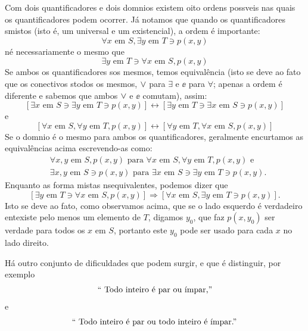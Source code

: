 Com dois quantificadores e dois dom\ih nios existem oito ordens poss\ih veis nas quais os quantificadores podem ocorrer. J\'a notamos que quando os quantificadores s\ao mistos (isto \'e, um universal e um existencial), a ordem \'e importante:
\[
\forall x \textrm{ em } S, \exists y \textrm{ em } T \ni  p(x,y)
\]
n\ao \'e necessariamente o mesmo que
\[
\exists y \textrm{ em } T \ni \forall x \textrm{ em } S, p(x,y)
\]
Se ambos os quantificadores s\ao os mesmos, temos equival\^encia (isto se deve ao fato que os conectivos s\ao todos os mesmos, $\vee$ para $\exists$ e $\ee$ para $\forall$; apenas a ordem \'e diferente e sabemos que ambos $\vee$ e $\ee$ comutam), assim:
\[
[\exists x \textrm{ em } S \ni \exists y \textrm{ em } T \ni p(x,y)]\leftrightarrow[\exists y \textrm{ em } T \ni \exists x \textrm{ em } S \ni p(x,y)]
\]
e
\[
[\forall x \textrm{ em } S, \forall y \textrm{ em } T, p(x,y)]\leftrightarrow[\forall y \textrm{ em } T, \forall x \textrm{ em } S, p(x,y)]
\]
Se o dom\ih nio \'e o mesmo para ambos os quantificadores, geralmente encurtamos as equival\^encias acima escrevendo-as como:
\begin{equation*}
 \begin{aligned}
  &\forall x,y \textrm{ em } S, p(x,y) \textrm{ para }  \forall x \textrm{ em } S, \forall y \textrm{ em } T, p(x,y) \textrm{ e }\\
  &\exists x,y \textrm{ em } S \ni p(x,y) \textrm{ para } \exists x \textrm{ em } S \ni \exists y \textrm{ em } T \ni p(x,y).
 \end{aligned}
\end{equation*}
Enquanto as forma mistas n\ao s\ao equivalentes, podemos dizer que
\[
[\exists y \textrm{ em } T \ni \forall x \textrm{ em } S, p(x,y)]\Rightarrow[\forall x \textrm{ em } S, \exists y \textrm{ em } T \ni  p(x,y)].
\]
Isto se deve ao fato, como observamos acima, que se o lado esquerdo \'e verdadeiro ent\ao existe pelo menos um elemento de $T$, digamos $y_0$, que faz $p(x,y_0)$ ser verdade para todos os $x$ em $S$, portanto este $y_0$ pode ser usado para cada $x$ no lado direito.

H\'a outro conjunto de dificuldades que podem surgir, e que \'e distinguir, por exemplo
\begin{equation*}
 \begin{aligned}
  \textrm{ `` Todo inteiro \'e par ou \ih mpar,'' }
   \end{aligned}
\end{equation*}
e
\begin{equation*}
 \begin{aligned}
  \textrm{ `` Todo inteiro \'e par ou todo inteiro \'e \ih mpar.'' }
   \end{aligned}
\end{equation*}


